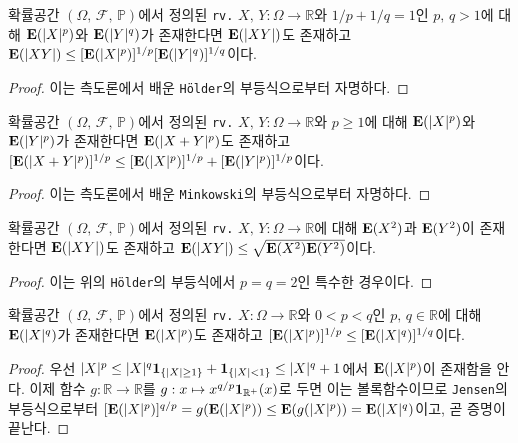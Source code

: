 \begin{theorem}
    확률공간 $(\Omega,\,\mathcal{F},\,\mathbb{P})$에서 정의된 \texttt{rv.} $X,\,Y:\Omega\to\mathbb{R}$와 $1/p+1/q=1$인 $p,\,q>1$에 대해 $\mathbf{E}(|X|^p)$와 $\mathbf{E}(|Y|^q)$가 존재한다면 $\mathbf{E}(|XY|)$도 존재하고 $\mathbf{E}(|XY|)\leq[\mathbf{E}(|X|^p)]^{1/p}[\mathbf{E}(|Y|^q)]^{1/q}$이다.
\end{theorem}

\begin{proof}
    이는 측도론에서 배운 \texttt{H\"older}의 부등식으로부터 자명하다.
\end{proof}

\begin{theorem}
    확률공간 $(\Omega,\,\mathcal{F},\,\mathbb{P})$에서 정의된 \texttt{rv.} $X,\,Y:\Omega\to\mathbb{R}$와 $p\geq1$에 대해 $\mathbf{E}(|X|^p)$와 $\mathbf{E}(|Y|^p)$가 존재한다면 $\mathbf{E}(|X+Y|^p)$도 존재하고 $[\mathbf{E}(|X+Y|^p)]^{1/p}\leq[\mathbf{E}(|X|^p)]^{1/p}+[\mathbf{E}(|Y|^p)]^{1/p}$이다.
\end{theorem}

\begin{proof}
    이는 측도론에서 배운 \texttt{Minkowski}의 부등식으로부터 자명하다.
\end{proof}

\begin{corollary}
    확률공간 $(\Omega,\,\mathcal{F},\,\mathbb{P})$에서 정의된 \texttt{rv.} $X,\,Y:\Omega\to\mathbb{R}$에 대해 $\mathbf{E}(X^2)$과 $\mathbf{E}(Y^2)$이 존재한다면 $\mathbf{E}(|XY|)$도 존재하고 $\mathbf{E}(|XY|)\leq\sqrt{\mathbf{E}(X^2)\mathbf{E}(Y^2)}$이다.
\end{corollary}

\begin{proof}
    이는 위의 \texttt{H\"older}의 부등식에서 $p=q=2$인 특수한 경우이다.
\end{proof}

\begin{theorem}
    확률공간 $(\Omega,\,\mathcal{F},\,\mathbb{P})$에서 정의된 \texttt{rv.} $X:\Omega\to\mathbb{R}$와 $0<p<q$인 $p,\,q\in\mathbb{R}$에 대해 $\mathbf{E}(|X|^q)$가 존재한다면 $\mathbf{E}(|X|^p)$도 존재하고 $[\mathbf{E}(|X|^p)]^{1/p}\leq[\mathbf{E}(|X|^q)]^{1/q}$이다.
\end{theorem}

\begin{proof}
    우선 $|X|^p\leq|X|^q\mathbf{1}_{\{|X|\geq1\}}+\mathbf{1}_{\{|X|<1\}}\leq|X|^q+1$에서 $\mathbf{E}(|X|^p)$이 존재함을 안다. 이제 함수 $g:\mathbb{R}\to\mathbb{R}$를 $g:x\mapsto x^{q/p}\mathbf{1}_{\mathbb{R}^+}(x)$로 두면 이는 볼록함수이므로 \texttt{Jensen}의 부등식으로부터 $[\mathbf{E}(|X|^p)]^{q/p}=g(\mathbf{E}(|X|^p))\leq\mathbf{E}(g(|X|^p))=\mathbf{E}(|X|^q)$이고, 곧 증명이 끝난다.
\end{proof}

